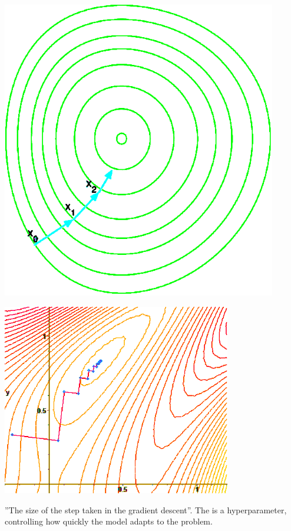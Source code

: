 \documentclass[
../../EiKI_Summary.tex,
]
{subfiles}
\begin{document}
\begin{defbox}
    \begin{minipage}
        [t]{0.4\textwidth}
        \centering
        \includegraphics[width=0.9\textwidth]{Pics/04/GradientDescent1.png}
    \end{minipage}
    \begin{minipage}
        [t]{0.6\textwidth}
        \centering
        \includegraphics[width=0.75\textwidth]{Pics/04/GradientDescent2.png}
    \end{minipage}
\end{defbox}

\begin{defbox}
    ''The size of the step taken in the gradient descent''. The  is a hyperparameter, controlling how quickly the model adapts to the problem.
\end{defbox}
\end{document}
